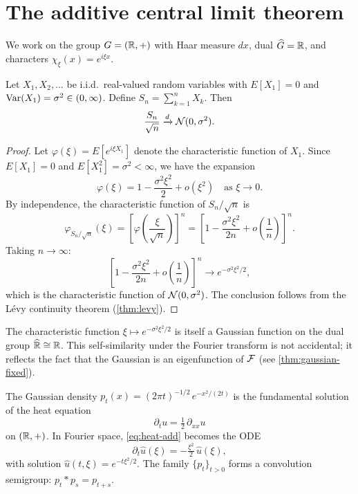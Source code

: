 \section{The additive central limit theorem}

We work on the group $G = (\mathbb{R}, +)$ with Haar measure $dx$, dual $\widehat{G} = \mathbb{R}$, and characters $\chi_\xi(x) = e^{i\xi x}$.

\begin{theorem}\label{thm:add-clt}
Let $X_1, X_2, \ldots$ be i.i.d.\ real-valued random variables with $E[X_1] = 0$ and $\operatorname{Var}(X_1) = \sigma^2 \in (0, \infty)$. Define $S_n = \sum_{k=1}^n X_k$. Then
\[
\frac{S_n}{\sqrt{n}} \xrightarrow{d} \mathcal{N}(0, \sigma^2).
\]
\end{theorem}

\begin{proof}
Let $\varphi(\xi) = E[e^{i\xi X_1}]$ denote the characteristic function of $X_1$. Since $E[X_1] = 0$ and $E[X_1^2] = \sigma^2 < \infty$, we have the expansion
\[
\varphi(\xi) = 1 - \frac{\sigma^2 \xi^2}{2} + o(\xi^2) \quad \text{as } \xi \to 0.
\]
By independence, the characteristic function of $S_n / \sqrt{n}$ is
\[
\varphi_{S_n/\sqrt{n}}(\xi)
= \left[\varphi\!\left(\frac{\xi}{\sqrt{n}}\right)\right]^n
= \left[1 - \frac{\sigma^2 \xi^2}{2n} + o\!\left(\frac{1}{n}\right)\right]^n.
\]
Taking $n \to \infty$:
\[
\left[1 - \frac{\sigma^2 \xi^2}{2n} + o\!\left(\frac{1}{n}\right)\right]^n \longrightarrow e^{-\sigma^2 \xi^2 / 2},
\]
which is the characteristic function of $\mathcal{N}(0, \sigma^2)$. The conclusion follows from the L\'evy continuity theorem (\cref{thm:levy}).
\end{proof}

\begin{remark}\label{rmk:gaussian-dual}
The characteristic function $\xi \mapsto e^{-\sigma^2\xi^2/2}$ is itself a Gaussian function on the dual group $\widehat{\mathbb{R}} \cong \mathbb{R}$. This self-similarity under the Fourier transform is not accidental; it reflects the fact that the Gaussian is an eigenfunction of $\mathcal{F}$ (see \cref{thm:gaussian-fixed}).
\end{remark}

\begin{proposition}\label{prop:heat-add}
The Gaussian density $p_t(x) = (2\pi t)^{-1/2}\, e^{-x^2/(2t)}$ is the fundamental solution of the heat equation
\begin{equation}\label{eq:heat-add}
\partial_t u = \tfrac{1}{2}\, \partial_{xx} u
\end{equation}
on $(\mathbb{R}, +)$. In Fourier space, \eqref{eq:heat-add} becomes the ODE
\begin{equation}\label{eq:heat-add-fourier}
\partial_t \widehat{u}(\xi) = -\tfrac{\xi^2}{2}\, \widehat{u}(\xi),
\end{equation}
with solution $\widehat{u}(t, \xi) = e^{-t\xi^2/2}$. The family $\{p_t\}_{t > 0}$ forms a convolution semigroup: $p_t * p_s = p_{t+s}$.
\end{proposition}

